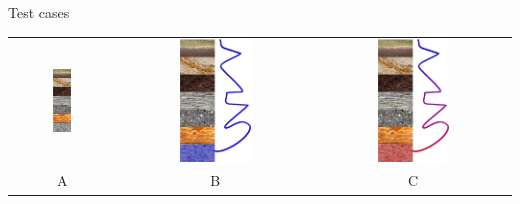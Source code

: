 \documentclass{beamer}
\begin{document}
\begin{frame}{Test cases}
\begin{tabular}{c|c|c}
\includegraphics[width=0.19\textwidth]{figure/gecoover}&
\includegraphics[width=0.386\textwidth]{figure/coldchannel}&
\includegraphics[width=0.386\textwidth]{figure/hotchannel}\\
A & B & C 
\end{tabular}
\end{frame}
\end{document}
